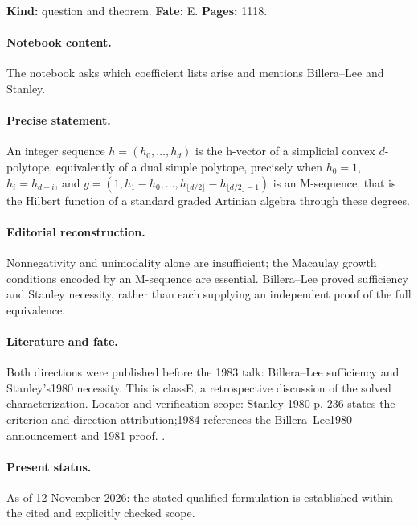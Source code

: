 \label{item:1983-600.11}

\noindent\textbf{Kind:} question and theorem. \textbf{Fate:} E. \textbf{Pages:} 1118.\par

\paragraph{Notebook content.} The notebook asks which coefficient lists arise and mentions Billera--Lee and Stanley.

\paragraph{Precise statement.} An integer sequence \(h=(h_0,\ldots,h_d)\) is the h-vector of a simplicial convex \(d\)-polytope, equivalently of a dual simple polytope, precisely when \(h_0=1\), \(h_i=h_{d-i}\), and \(g=(1,h_1-h_0,\ldots,h_{\lfloor d/2\rfloor}-h_{\lfloor d/2\rfloor-1})\) is an M-sequence, that is the Hilbert function of a standard graded Artinian algebra through these degrees.

\paragraph{Editorial reconstruction.} Nonnegativity and unimodality alone are insufficient; the Macaulay growth conditions encoded by an M-sequence are essential. Billera--Lee proved sufficiency and Stanley necessity, rather than each supplying an independent proof of the full equivalence.

\paragraph{Literature and fate.} Both directions were published before the 1983 talk: Billera--Lee sufficiency and Stanley's1980 necessity. This is classE, a retrospective discussion of the solved characterization. Locator and verification scope: Stanley 1980 p. 236 states the criterion and direction attribution;1984 references the Billera--Lee1980 announcement and 1981 proof. \cite{stanley1980faces,stanley1984lefschetz}.

\paragraph{Present status.} As of 12 November 2026: the stated qualified formulation is established within the cited and explicitly checked scope.

